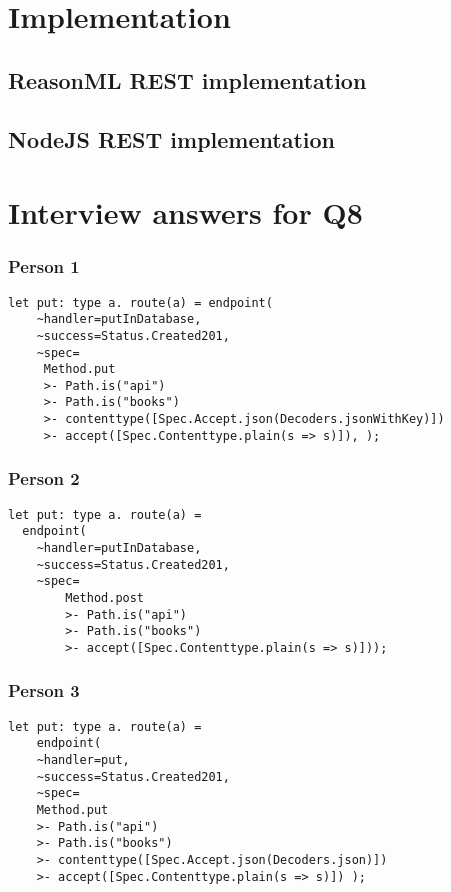 \begin{appendices}
\chapter{Implementation}\label{appendix}

\section{ReasonML REST implementation}\label{reasonmlrest}


\section{NodeJS REST implementation}\label{nodejsrest}


\chapter{Interview answers for Q8}
\subsection{Person 1}\label{putperson1}
\begin{lstlisting}
let put: type a. route(a) = endpoint(
	~handler=putInDatabase, 
    ~success=Status.Created201, 
    ~spec= 
	 Method.put 
	 >- Path.is("api")
	 >- Path.is("books") 
	 >- contenttype([Spec.Accept.json(Decoders.jsonWithKey)]) 
	 >- accept([Spec.Contenttype.plain(s => s)]), ); 
\end{lstlisting}

\subsection{Person 2}\label{putperson2}
\begin{lstlisting}
let put: type a. route(a) =
  endpoint(
	~handler=putInDatabase,
	~success=Status.Created201,
	~spec=
		Method.post
		>- Path.is("api")
		>- Path.is("books")
		>- accept([Spec.Contenttype.plain(s => s)]));
\end{lstlisting}

\subsection{Person 3}\label{putperson3}
\begin{lstlisting}
let put: type a. route(a) =
    endpoint(
	~handler=put,
	~success=Status.Created201,
	~spec=
	Method.put
	>- Path.is("api")
	>- Path.is("books")
	>- contenttype([Spec.Accept.json(Decoders.json)])
	>- accept([Spec.Contenttype.plain(s => s)]) );
\end{lstlisting}


\end{appendices}
